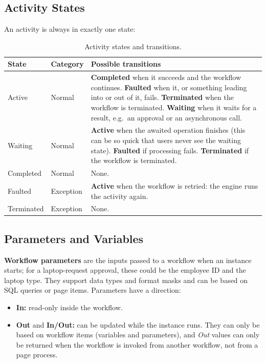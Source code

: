 \documentclass[11pt,a4paper]{article}
\begin{document}
\subsection{Activity States}
An activity is always in exactly one state:
\begin{table}[H]
\centering\small
\begin{tabularx}{\textwidth}{@{}llL@{}}
\toprule
\sffamily\bfseries State & \sffamily\bfseries Category & \sffamily\bfseries Possible transitions \\
\midrule
Active & Normal & \textbf{Completed} when it succeeds and the workflow continues. \textbf{Faulted} when it, or something leading into or out of it, fails. \textbf{Terminated} when the workflow is terminated. \textbf{Waiting} when it waits for a result, e.g.\ an approval or an asynchronous call. \\
Waiting & Normal & \textbf{Active} when the awaited operation finishes (this can be so quick that users never see the waiting state). \textbf{Faulted} if processing fails. \textbf{Terminated} if the workflow is terminated. \\
Completed & Normal & None. \\
Faulted & Exception & \textbf{Active} when the workflow is retried: the engine runs the activity again. \\
Terminated & Exception & None. \\
\bottomrule
\end{tabularx}
\caption{Activity states and transitions.}
\end{table}

\subsection{Parameters and Variables}
\textbf{Workflow parameters} are the inputs passed to a workflow when an instance starts; for a laptop-request approval, these could be the employee ID and the laptop type. They support data types and format masks and can be based on SQL queries or page items. Parameters have a direction:
\begin{itemize}
\item \textbf{In:} read-only inside the workflow.
\item \textbf{Out} and \textbf{In/Out:} can be updated while the instance runs. They can only be based on workflow items (variables and parameters), and \emph{Out} values can only be returned when the workflow is invoked from another workflow, not from a page process.
\end{itemize}
\end{document}
